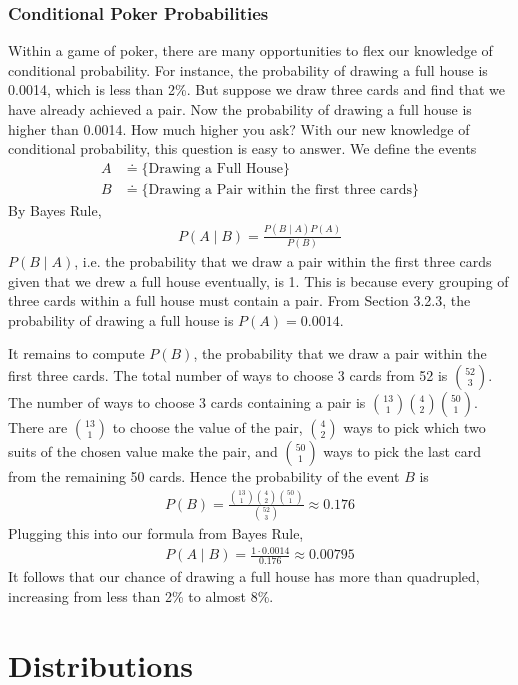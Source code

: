 \documentclass{tufte-book}
\theoremstyle{definition}
\numberwithin{theorem}{section}
\numberwithin{definition}{section}
\numberwithin{lemma}{section}
\numberwithin{corollary}{section}
\numberwithin{proposition}{section}
\numberwithin{remark}{section}
\numberwithin{claim}{section}
\numberwithin{observation}{section}
\numberwithin{fact}{section}
\numberwithin{assumption}{section}
\numberwithin{example}{section}
\numberwithin{exercise}{section}
\begin{document}
\subsection{Conditional Poker Probabilities}
Within a game of poker, there are many opportunities to flex our knowledge of conditional probability. For instance, the probability of drawing a full house is 0.0014, which is less than 2\%. But suppose we draw three cards and find that we have already achieved a pair. Now the probability of drawing a full house is higher than 0.0014. How much higher you ask? With our new knowledge of conditional probability, this question is easy to answer. We define the events
\begin{align*}
A &\doteq \{\text{Drawing a Full House}\} \\
B &\doteq \{\text{Drawing a Pair within the first three cards}\}
\end{align*}
By Bayes Rule,
\begin{align*}
P(A \mid B) = \frac{P(B \mid A) P(A)}{P(B)}
\end{align*}
$P(B \mid A)$, i.e. the probability that we draw a pair within the first three cards given that we drew a full house eventually, is 1. This is because every grouping of three cards within a full house must contain a pair. From Section 3.2.3, the probability of drawing a full house is $P(A) = 0.0014$. 

It remains to compute $P(B)$, the probability that we draw a pair within the first three cards. The total number of ways to choose 3 cards from 52 is $\binom{52}{3}$. The number of ways to choose 3 cards containing a pair is $\binom{13}{1} \binom{4}{2} \binom{50}{1}$. There are $\binom{13}{1}$ to choose the value of the pair, $\binom{4}{2}$ ways to pick which two suits of the chosen value make the pair, and $\binom{50}{1}$ ways to pick the last card from the remaining 50 cards. Hence the probability of the event $B$ is
\begin{align*}
P(B) = \frac{\binom{13}{1} \binom{4}{2} \binom{50}{1}}{\binom{52}{3}} \approx 0.176
\end{align*}
Plugging this into our formula from Bayes Rule,
\begin{align*}
P(A \mid B) = \frac{1 \cdot 0.0014}{0.176} \approx 0.00795
\end{align*}
It follows that our chance of drawing a full house has more than quadrupled, increasing from less than 2\% to almost 8\%. 


\chapter*{Distributions}
\end{document}
